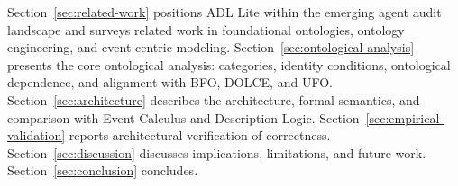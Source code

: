 Section~\ref{sec:related-work} positions ADL Lite within the emerging agent audit landscape and surveys related work in foundational ontologies, ontology engineering, and event-centric modeling. Section~\ref{sec:ontological-analysis} presents the core ontological analysis: categories, identity conditions, ontological dependence, and alignment with BFO, DOLCE, and UFO. Section~\ref{sec:architecture} describes the architecture, formal semantics, and comparison with Event Calculus and Description Logic. Section~\ref{sec:empirical-validation} reports architectural verification of correctness. Section~\ref{sec:discussion} discusses implications, limitations, and future work. Section~\ref{sec:conclusion} concludes.
